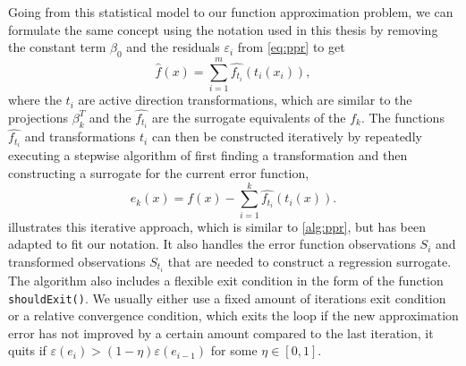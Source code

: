 \documentclass[
  a4paper,  %
  twoside,  %
  bibliography=totoc,
  headsepline,
  cleardoublepage=empty,
  parskip=half,
  draft=false
]{scrbook}
\begin{document}
Going from this statistical model to our function approximation problem, we can formulate the same concept using the notation used in this thesis by removing the constant term $\beta_0$ and the residuals $\varepsilon_i$ from \cref{eq:ppr} to get
\begin{equation}
\hat{f}(x)=\sum_{i=1}^m \hat{f_{t_i}}(t_i(x_i)),
\end{equation}
%
where the $t_i$ are active direction transformations, which are similar to the projections $\beta_k^T$ and the $\hat{f_{t_i}}$ are the surrogate equivalents of the $f_k$.
The functions $\hat{f_{t_i}}$ and transformations $t_i$ can then be constructed iteratively by repeatedly executing a stepwise algorithm of first finding a transformation and then constructing a surrogate for the current error function,
\begin{equation}
e_k(x)=f(x) - \sum_{i=1}^k \hat{f_{t_i}}(t_i(x)).
\end{equation}
%
 illustrates this iterative approach, which is similar to \cref{alg:ppr}, but has been adapted to fit our notation.
It also handles the error function observations $S_i$ and transformed observations $S_{t_i}$ that are needed to construct a regression surrogate.
The algorithm also includes a flexible exit condition in the form of the function \texttt{shouldExit()}.
We usually either use a fixed amount of iterations exit condition or a relative convergence condition, which exits the loop if the new approximation error has not improved by a certain amount compared to the last iteration, \ie it quits if $\varepsilon(e_i) > (1 - \eta) \varepsilon(e_{i - 1})$ for some $\eta \in [0,1]$.
\end{document}
